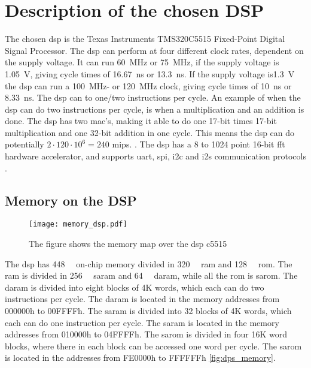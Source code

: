 \section{Description of the chosen DSP}


The chosen \gls{dsp} is the Texas Instruments TMS320C5515 Fixed-Point Digital Signal Processor.
The \gls{dsp} can perform at four different clock rates, dependent on the supply voltage. It can run \SI{60}{\mega\hertz} or \SI{75}{\mega\hertz}, if the supply voltage is \SI{1.05}{\volt}, giving cycle times of \SI{16.67}{\nano\second} or \SI{13.3}{\nano\second}. If the supply voltage is\SI{1.3}{\volt} the \gls{dsp} can run a \SI{100}{\mega\hertz}- or \SI{120}{\mega\hertz} clock, giving cycle times of \SI{10}{\nano\second} or \SI{8.33}{\nano\second}. The \gls{dsp} can to one/two instructions per cycle. An example of when the \gls{dsp} can do two instructions per cycle, is when a multiplication and an addition is done. The \gls{dsp} has two \gls{mac}'s, making it able to do one 17-bit times 17-bit multiplication and one 32-bit addition in one cycle. This means the \gls{dsp} can do potentially $2 \cdot 120 \cdot 10^6 = 240$ \gls{mips}. . The \gls{dsp} has a 8 to 1024 point 16-bit \gls{fft} hardware accelerator, and supports \gls{uart}, \gls{spi}, \gls{i2c} and \gls{i2s} communication protocols \cite{c55515}.
\subsection{Memory on the DSP}
\begin{figure}[h]
	\centering
		\texttt{[image: memory\_dsp.pdf]}
		\caption{The figure shows the memory map over the \gls{dsp} c5515}
		\label{fig:dps_memory}
\end{figure}
The \gls{dsp} has \SI{448}{\kilo\byte} on-chip memory divided in \SI{320}{\kilo\byte} \gls{ram} and \SI{128}{\kilo\byte} \gls{rom}. The \gls{ram} is divided in \SI{256}{\kilo\byte} \gls{saram} and \SI{64}{\kilo\byte} \gls{daram}, while all the \gls{rom} is \gls{sarom}.
The \gls{daram} is divided into eight blocks of 4K words, which each can do two instructions per cycle. The \gls{daram} is located in the memory addresses from 000000h to 00FFFFh. The \gls{saram} is divided into 32 blocks of 4K words, which each can do one instruction per cycle. The \gls{saram} is located in the memory addresses from 010000h to 04FFFFh. The \gls{sarom} is divided in four 16K word blocks, where there in each block can be accessed one word per cycle. The \gls{sarom} is located in the addresses from FE0000h to FFFFFFh \cite{c5515} \autoref{fig:dps_memory}.
